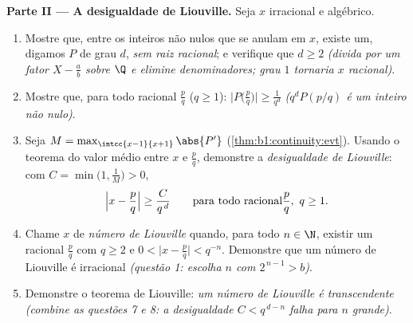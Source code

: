 \begin{problem}
\medskip
\noindent\textbf{Parte II --- A desigualdade de Liouville.} Seja $x$
irracional e algébrico.
\begin{enumerate}
  \item Mostre que, entre os  inteiros não nulos que se
        anulam em $x$, existe um, digamos $P$ de grau $d$,
        \emph{sem raiz racional}; e verifique que $d \geq 2$
        \emph{(divida por um fator $X - \frac ab$ sobre $\Q$ e
        elimine denominadores; grau $1$ tornaria $x$
        racional)}.
  \item Mostre que, para todo racional $\frac pq$ ($q \geq 1$):
        $\bigl|P\bigl(\frac pq\bigr)\bigr| \geq \frac{1}{q^d}$
        \emph{($q^d P(p/q)$ é um inteiro não nulo)}.
  \item Seja $M = \max_{\intcc{x-1}{x+1}} \abs{P'}$
        (\cref{thm:b1:continuity:evt}). Usando o teorema do valor
        médio entre $x$ e $\frac pq$, demonstre a
        \emph{desigualdade de Liouville}: com $C = \min\bigl(1,
        \frac 1M\bigr) > 0$,
        \[
        \Bigl| x - \frac pq \Bigr| \geq \frac{C}{q^{\,d}}
        \qquad\text{para todo racional} \frac pq,\ q \geq 1 .
        \]
  \item Chame $x$ de \emph{número de Liouville} quando, para todo $n \in
        \N$, existir um racional $\frac pq$ com $q \geq 2$ e
        $0 < \bigl|x - \frac pq\bigr| < q^{-n}$. Demonstre que um
        número de Liouville é irracional \emph{(questão 1: escolha
        $n$ com $2^{\,n-1} > b$)}.
  \item Demonstre o teorema de Liouville: \emph{um número de Liouville é
        transcendente} \emph{(combine as questões 7 e 8: a
        desigualdade $C < q^{\,d-n}$ falha para $n$ grande)}.
\end{enumerate}


\end{problem}
